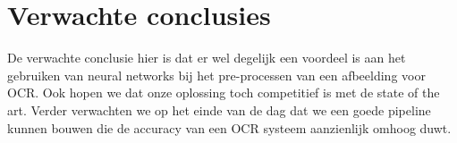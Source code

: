 \section{Verwachte conclusies}
\label{sec:verwachte_conclusies}

De verwachte conclusie hier is dat er wel degelijk een voordeel is aan het gebruiken van neural networks bij het pre-processen van een afbeelding voor OCR.
Ook hopen we dat onze oplossing toch competitief is met de state of the art. Verder verwachten we op het einde van de dag dat we een goede pipeline kunnen bouwen die de accuracy van een OCR systeem aanzienlijk omhoog duwt.

